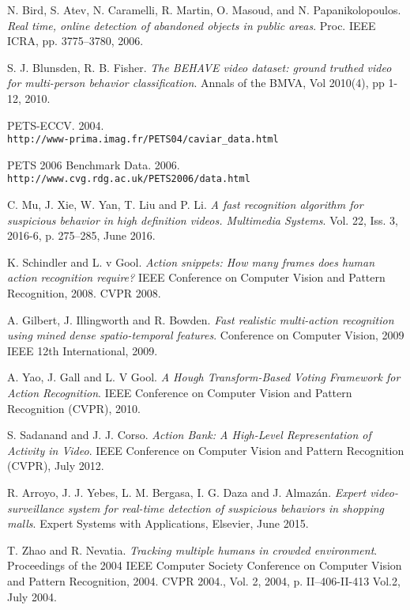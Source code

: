 \begin{thebibliography}{20}
N. Bird, S. Atev, N. Caramelli, R. Martin, O. Masoud, and N. Papanikolopoulos.
\textit{Real time, online detection of abandoned objects in public areas}. 
Proc. IEEE ICRA, pp. 3775–3780, 2006.

S. J. Blunsden, R. B. Fisher.
\textit{The BEHAVE video dataset: ground truthed video for multi-person behavior classification}. 
Annals of the BMVA, Vol 2010(4), pp 1-12, 2010.

PETS-ECCV. 2004.
\\\texttt{http://www-prima.imag.fr/PETS04/caviar\_data.html}

PETS 2006 Benchmark Data. 2006.
\\\texttt{http://www.cvg.rdg.ac.uk/PETS2006/data.html}

C. Mu, J. Xie, W. Yan, T. Liu and P. Li.
\textit{A fast recognition algorithm for suspicious behavior in high definition videos. Multimedia Systems}. 
Vol. 22, Iss. 3, 2016-6, p. 275–285, June 2016.

K. Schindler and L. v Gool.
\textit{Action snippets: How many frames does human action recognition require?} 
IEEE Conference on Computer Vision and Pattern Recognition, 2008. CVPR 2008. 

A. Gilbert, J. Illingworth and R. Bowden.
\textit{Fast realistic multi-action recognition using mined dense spatio-temporal features}. 
Conference on Computer Vision, 2009 IEEE 12th International, 2009.

A. Yao, J. Gall and L. V Gool.
\textit{A Hough Transform-Based Voting Framework for Action Recognition}. 
IEEE Conference on Computer Vision and Pattern Recognition (CVPR), 2010.

S. Sadanand and J. J. Corso.
\textit{Action Bank: A High-Level Representation of Activity in Video}. 
IEEE Conference on Computer Vision and Pattern Recognition (CVPR), July 2012. 

R. Arroyo, J. J. Yebes, L. M. Bergasa, I. G. Daza and J. Almazán.
\textit{Expert video-surveillance system for real-time detection of suspicious behaviors in shopping malls}. 
Expert Systems with Applications, Elsevier, June 2015.

T. Zhao and R. Nevatia.
\textit{Tracking multiple humans in crowded environment}. 
Proceedings of the 2004 IEEE Computer Society Conference on Computer Vision and Pattern Recognition, 2004. CVPR 2004., Vol. 2, 2004, p. II–406-II-413 Vol.2, July 2004.


\end{thebibliography}
